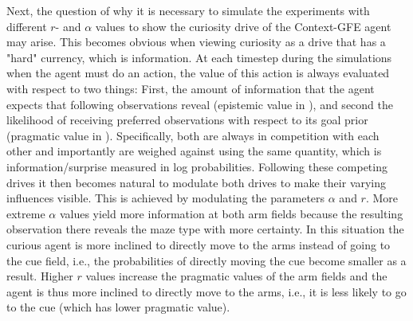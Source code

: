 Next, the question of why it is necessary to simulate the experiments with different \(r\)- and \(\alpha\) values to show the curiosity drive of the Context-GFE agent may arise. This becomes obvious when viewing curiosity as a drive that has a "hard" currency, which is information. At each timestep during the simulations when the agent must do an action, the value of this action is always evaluated with respect to two things: First, the amount of information that the agent expects that following observations reveal (epistemic value in \cite{friston2015}), and second the likelihood of receiving preferred observations with respect to its goal prior (pragmatic value in \cite{friston2015}). Specifically, both are always in competition with each other and importantly are weighed against using the same quantity, which is information/surprise measured in log probabilities. Following these competing drives it then becomes natural to modulate both drives to make their varying influences visible. This is achieved by modulating the parameters \(\alpha\) and \(r\). More extreme \(\alpha\) values yield more information at both arm fields because the resulting observation there reveals the maze type with more certainty. In this situation the curious agent is more inclined to directly move to the arms instead of going to the cue field, i.e., the probabilities of directly moving the cue become smaller as a result. Higher \(r\) values increase the pragmatic values of the arm fields and the agent is thus more inclined to directly move to the arms, i.e., it is less likely to go to the cue (which has lower pragmatic value).

